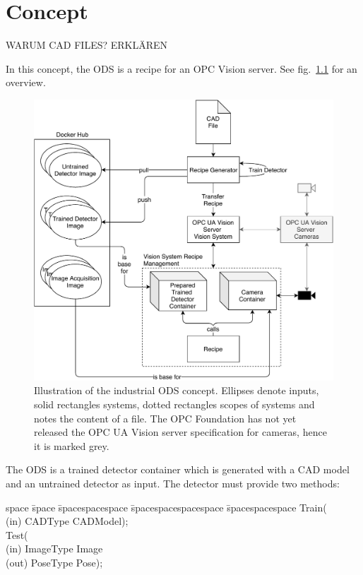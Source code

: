 \chapter{Concept\label{cha:chapter4}}
WARUM CAD FILES? ERKLÄREN

In this concept, the ODS is a recipe for an OPC Vision server. See fig.~\ref{fig:concept} for an overview. 
\begin{figure}
    \centering
    \includegraphics[width=\textwidth]{img/Concept.pdf}
    \caption[Concept]{Illustration of the industrial ODS concept. Ellipses denote inputs, solid rectangles systems, dotted rectangles scopes of systems and notes the content of a file. The OPC Foundation has not yet released the OPC UA Vision server specification for cameras, hence it is marked grey.}
    \label{fig:concept}
\end{figure}

The ODS is a trained detector container which is generated with a CAD model and an untrained detector as input. The detector must provide two methods:
\begin{tabbing}
    space \= space \= spacespacespace \= spacespacespacespace \= spacespacespace \kill
    \>  Train(\\
    \>  \>  (in)	 \> 	CADType          \> CADModel); \\
    \>  Test(\\
    \>  \>  (in)	 \> 	ImageType     \> Image\\
    \>  \>  (out)	 \> 	PoseType           \> Pose); 
\end{tabbing}\label{detectormethods}

